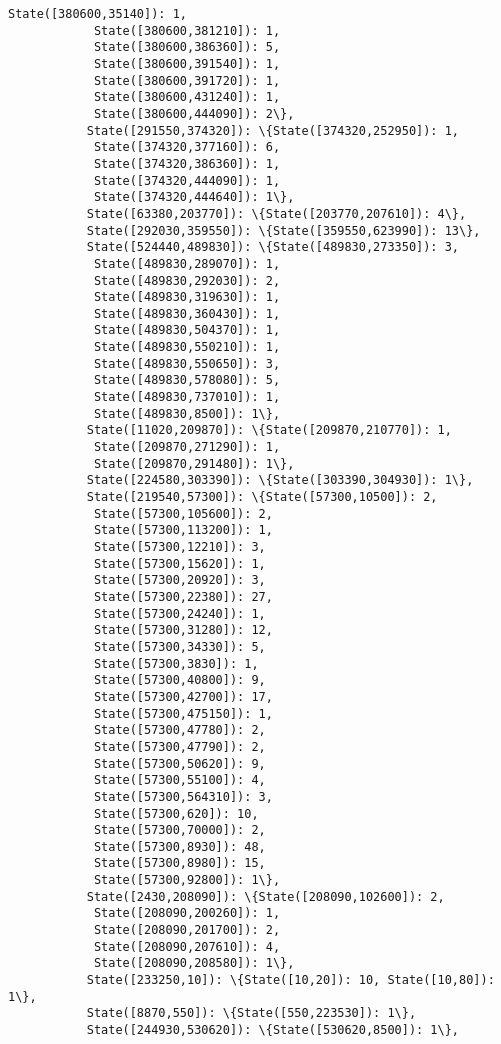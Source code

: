 \documentclass[11pt]{article}
\begin{document}
\begin{Verbatim}[commandchars=\\\{\}]
            State([380600,35140]): 1,
            State([380600,381210]): 1,
            State([380600,386360]): 5,
            State([380600,391540]): 1,
            State([380600,391720]): 1,
            State([380600,431240]): 1,
            State([380600,444090]): 2\},
           State([291550,374320]): \{State([374320,252950]): 1,
            State([374320,377160]): 6,
            State([374320,386360]): 1,
            State([374320,444090]): 1,
            State([374320,444640]): 1\},
           State([63380,203770]): \{State([203770,207610]): 4\},
           State([292030,359550]): \{State([359550,623990]): 13\},
           State([524440,489830]): \{State([489830,273350]): 3,
            State([489830,289070]): 1,
            State([489830,292030]): 2,
            State([489830,319630]): 1,
            State([489830,360430]): 1,
            State([489830,504370]): 1,
            State([489830,550210]): 1,
            State([489830,550650]): 3,
            State([489830,578080]): 5,
            State([489830,737010]): 1,
            State([489830,8500]): 1\},
           State([11020,209870]): \{State([209870,210770]): 1,
            State([209870,271290]): 1,
            State([209870,291480]): 1\},
           State([224580,303390]): \{State([303390,304930]): 1\},
           State([219540,57300]): \{State([57300,10500]): 2,
            State([57300,105600]): 2,
            State([57300,113200]): 1,
            State([57300,12210]): 3,
            State([57300,15620]): 1,
            State([57300,20920]): 3,
            State([57300,22380]): 27,
            State([57300,24240]): 1,
            State([57300,31280]): 12,
            State([57300,34330]): 5,
            State([57300,3830]): 1,
            State([57300,40800]): 9,
            State([57300,42700]): 17,
            State([57300,475150]): 1,
            State([57300,47780]): 2,
            State([57300,47790]): 2,
            State([57300,50620]): 9,
            State([57300,55100]): 4,
            State([57300,564310]): 3,
            State([57300,620]): 10,
            State([57300,70000]): 2,
            State([57300,8930]): 48,
            State([57300,8980]): 15,
            State([57300,92800]): 1\},
           State([2430,208090]): \{State([208090,102600]): 2,
            State([208090,200260]): 1,
            State([208090,201700]): 2,
            State([208090,207610]): 4,
            State([208090,208580]): 1\},
           State([233250,10]): \{State([10,20]): 10, State([10,80]): 1\},
           State([8870,550]): \{State([550,223530]): 1\},
           State([244930,530620]): \{State([530620,8500]): 1\},

\end{Verbatim}
\end{document}
